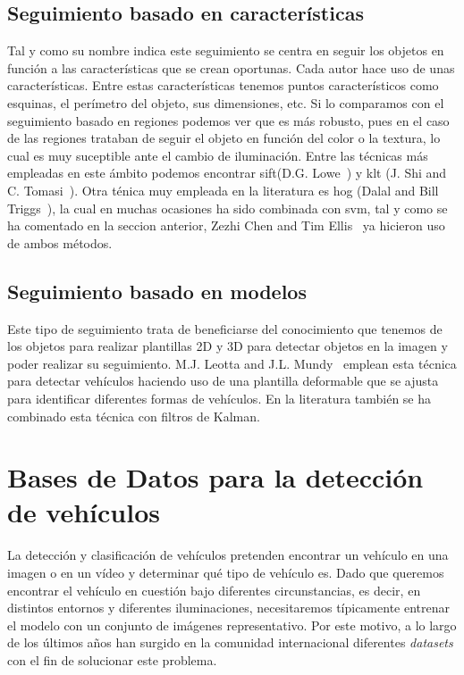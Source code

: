 \subsection{Seguimiento basado en características}

Tal y como su nombre indica este seguimiento se centra en seguir los objetos en función a las características que se crean oportunas. Cada autor hace uso de unas características. Entre estas características tenemos puntos característicos como esquinas, el perímetro del objeto, sus dimensiones, etc. Si lo comparamos con el seguimiento basado en regiones podemos ver que es más robusto, pues en el caso de las regiones trataban de seguir el objeto en función del color o la textura, lo cual es muy suceptible ante el cambio de iluminación. Entre las técnicas más empleadas en este ámbito podemos encontrar \acrfull{sift}(D.G. Lowe~\cite{article_sift}) y \acrfull{klt} (J. Shi and C. Tomasi~\cite{article_klt}). Otra ténica muy empleada en la literatura es \acrshort{hog} (Dalal and Bill Triggs~\cite{hog_paper}), la cual en muchas ocasiones ha sido combinada con \acrshort{svm}, tal y como se ha comentado en la seccion anterior, Zezhi Chen and Tim Ellis~\cite{multi_shape_descriptor} ya hicieron uso de ambos métodos.

\subsection{Seguimiento basado en modelos}

Este tipo de seguimiento trata de beneficiarse del conocimiento que tenemos de los objetos para realizar plantillas 2D y 3D para detectar objetos en la imagen y poder realizar su seguimiento. M.J. Leotta and J.L. Mundy~\cite{vehicle_surveillance_3d} emplean esta técnica para detectar vehículos haciendo uso de una plantilla deformable que se ajusta para identificar diferentes formas de vehículos. En la literatura también se ha combinado esta técnica con filtros de Kalman.


\section{Bases de Datos para la detección de vehículos}
\label{sec:dataset}

La detección y clasificación de vehículos pretenden encontrar un vehículo en una imagen o en un vídeo y determinar qué tipo de vehículo es. Dado que queremos encontrar el vehículo en cuestión bajo diferentes circunstancias, es decir, en distintos entornos y diferentes iluminaciones, necesitaremos típicamente entrenar el modelo con un conjunto de imágenes representativo. Por este motivo, a lo largo de los últimos años han surgido en la comunidad internacional diferentes \textit{datasets} con el fin de solucionar este problema.

